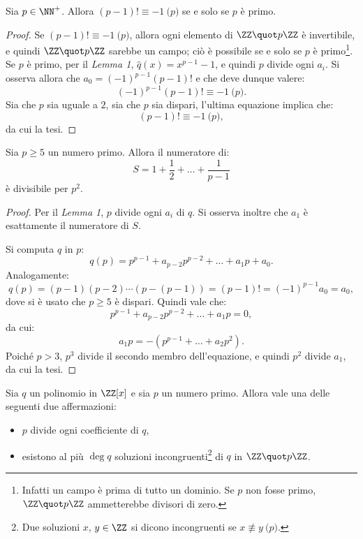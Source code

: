 \documentclass[12pt]{scrartcl}
\begin{document}
	\begin{theorem}[di Wilson]
		Sia $p \in \NN^+$. Allora $(p-1)! \equiv -1 \pod p$ se e solo se $p$ è primo.
	\end{theorem}
	
	\begin{proof}
		Se $(p-1)! \equiv -1 \pod p$, allora ogni elemento di $\ZZ \quot p \ZZ$ è
		invertibile, e quindi $\ZZ \quot p \ZZ$ sarebbe un campo; ciò è possibile
		se e solo se $p$ è primo\footnote{
			Infatti un campo è prima di tutto un dominio. Se $p$ non fosse
			primo, $\ZZ \quot p \ZZ$ ammetterebbe divisori di zero.
		}. Se $p$ è primo, per il \textit{Lemma 1}, $\hat q(x) = x^{p-1} - 1$, e quindi
		$p$ divide ogni $a_i$. Si
		osserva allora che $a_0 = (-1)^{p-1} (p-1)!$ e che deve dunque valere:
		\[ (-1)^{p-1} (p-1)! \equiv -1 \pod p. \]
		Sia che $p$ sia uguale a $2$, sia che $p$ sia dispari, l'ultima equazione
		implica che:
		\[ (p-1)! \equiv -1 \pod p, \]
		da cui la tesi.
 	\end{proof}
 	
 	\begin{theorem}[di Wolstenholme]
 		Sia $p \geq 5$ un numero primo. Allora il numeratore di:
 		\[
 			S = 1 + \frac{1}{2} + \ldots + \frac{1}{p-1}
 		\]
 		è divisibile per $p^2$.
 	\end{theorem}
 	
 	\begin{proof}
 		Per il \textit{Lemma 1}, $p$ divide ogni $a_i$ di $q$. Si osserva
 		inoltre che $a_1$ è esattamente il numeratore di $S$. \medskip
 

 		Si computa $q$ in $p$:
 		\[ 
 			q(p) = p^{p-1} + a_{p-2} p^{p-2} + \ldots + a_1 p + a_0.
 		\]
 		Analogamente:
 		\[
 			q(p) = (p-1)(p-2) \cdots (p-(p-1)) = (p-1)! = (-1)^{p-1} a_0 = a_0,
 		\]
 		dove si è usato che $p \geq 5$ è dispari. Quindi
 		vale che:
 		\[
 			p^{p-1} + a_{p-2} p^{p-2} + \ldots + a_1 p = 0,
 		\]
 		da cui:
 		\[
 			a_1 p = -(p^{p-1} + \ldots + a_2 p^2).
 		\]
 		Poiché $p > 3$, $p^3$ divide il secondo membro dell'equazione, e quindi
 		$p^2$ divide $a_1$, da cui la tesi.
 	\end{proof}
 	
 	\begin{theorem}
 		Sia $q$ un polinomio in $\ZZ[x]$ e sia $p$ un numero primo.
 		Allora vale una delle seguenti due affermazioni:
 
 		\begin{itemize}
 			\item $p$ divide ogni coefficiente di $q$,
 			\item esistono al più $\deg q$ soluzioni incongruenti\footnote{
 				Due soluzioni $x$, $y \in \ZZ$ si dicono incongruenti se
 				$x \not\equiv y \pod p$.
 			} di $q$ in
 				$\ZZ \quot p \ZZ$.
 		\end{itemize}
 	\end{theorem}
 	
\end{document}
